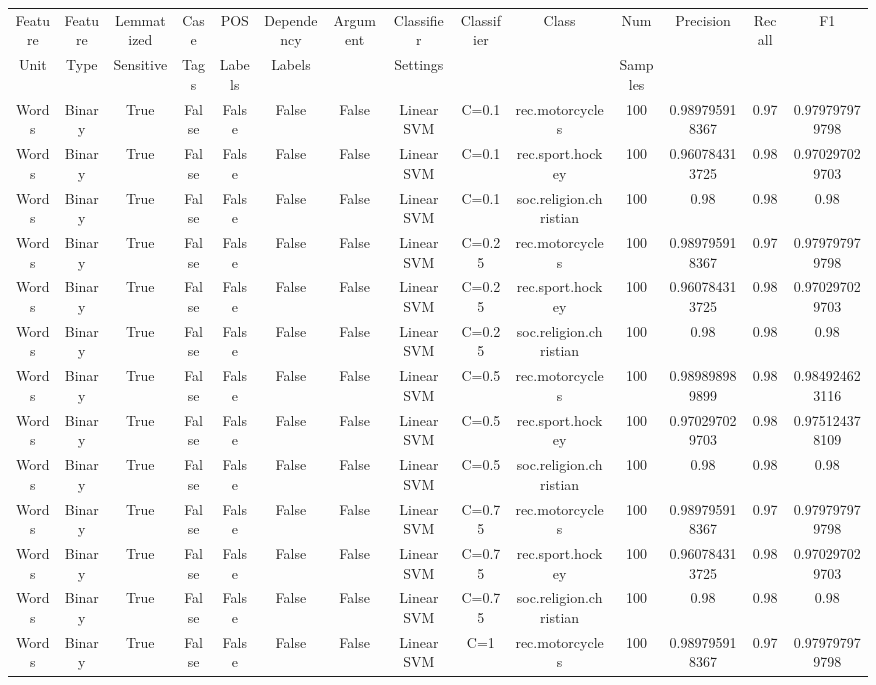 \documentclass{article}
\begin{document}
  \begin{tabular}{|c|c|c|c|c|c|c|c|c|c|c|c|c|c|}
  \hline
  Feature  & Feature  & Lemmatized & Case  &  POS  &  Dependency  &  Argument  & Classifier & Classifier  & Class & Num & Precision & Recall & F1 \\
  Unit & Type & Sensitive & Tags &  Labels &  Labels & & Settings & &  & Samples & & &  \\
  \hline
  Words & Binary & True & False & False & False & False & Linear SVM & C=0.1 & rec.motorcycles & 100 & 0.989795918367 & 0.97 & 0.979797979798 \\ 
Words & Binary & True & False & False & False & False & Linear SVM & C=0.1 & rec.sport.hockey & 100 & 0.960784313725 & 0.98 & 0.970297029703 \\ 
Words & Binary & True & False & False & False & False & Linear SVM & C=0.1 & soc.religion.christian & 100 & 0.98 & 0.98 & 0.98 \\ 
Words & Binary & True & False & False & False & False & Linear SVM & C=0.25 & rec.motorcycles & 100 & 0.989795918367 & 0.97 & 0.979797979798 \\ 
Words & Binary & True & False & False & False & False & Linear SVM & C=0.25 & rec.sport.hockey & 100 & 0.960784313725 & 0.98 & 0.970297029703 \\ 
Words & Binary & True & False & False & False & False & Linear SVM & C=0.25 & soc.religion.christian & 100 & 0.98 & 0.98 & 0.98 \\ 
Words & Binary & True & False & False & False & False & Linear SVM & C=0.5 & rec.motorcycles & 100 & 0.989898989899 & 0.98 & 0.984924623116 \\ 
Words & Binary & True & False & False & False & False & Linear SVM & C=0.5 & rec.sport.hockey & 100 & 0.970297029703 & 0.98 & 0.975124378109 \\ 
Words & Binary & True & False & False & False & False & Linear SVM & C=0.5 & soc.religion.christian & 100 & 0.98 & 0.98 & 0.98 \\ 
Words & Binary & True & False & False & False & False & Linear SVM & C=0.75 & rec.motorcycles & 100 & 0.989795918367 & 0.97 & 0.979797979798 \\ 
Words & Binary & True & False & False & False & False & Linear SVM & C=0.75 & rec.sport.hockey & 100 & 0.960784313725 & 0.98 & 0.970297029703 \\ 
Words & Binary & True & False & False & False & False & Linear SVM & C=0.75 & soc.religion.christian & 100 & 0.98 & 0.98 & 0.98 \\ 
Words & Binary & True & False & False & False & False & Linear SVM & C=1 & rec.motorcycles & 100 & 0.989795918367 & 0.97 & 0.979797979798 \\ 

\end{tabular}
\end{document}
